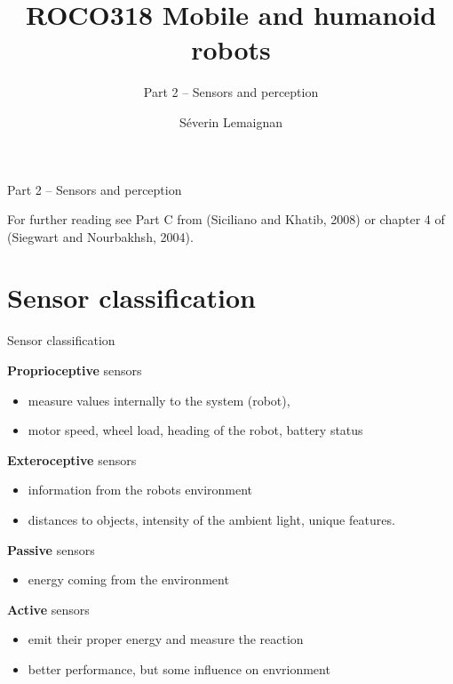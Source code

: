 \documentclass[compress]{beamer}
\title{ROCO318 \newline Mobile and humanoid robots}
\subtitle{Part 2 -- Sensors and perception}
\date{}
\author{Séverin Lemaignan}
\institute{Centre for Neural Systems and Robotics\\{\bf Plymouth University}}
\begin{document}

\maketitle

\begin{frame}{Part 2 -- Sensors and perception}

For further reading see Part C from (Siciliano and Khatib, 2008) or
chapter 4 of (Siegwart and Nourbakhsh, 2004).

\end{frame}

\section{Sensor classification}\label{sensor-classification}

\begin{frame}{Sensor classification}

\textbf{Proprioceptive} sensors

\begin{itemize}

\item
  measure values internally to the system (robot),
\item
  \eg motor speed, wheel load, heading of the robot, battery status
\end{itemize}

\textbf{Exteroceptive} sensors

\begin{itemize}

\item
  information from the robots environment
\item
  distances to objects, intensity of the ambient light, unique features.
\end{itemize}

\textbf{Passive} sensors

\begin{itemize}

\item
  energy coming from the environment
\end{itemize}

\textbf{Active} sensors

\begin{itemize}

\item
  emit their proper energy and measure the reaction
\item
  better performance, but some influence on envrionment
\end{itemize}

\end{frame}
\end{document}
